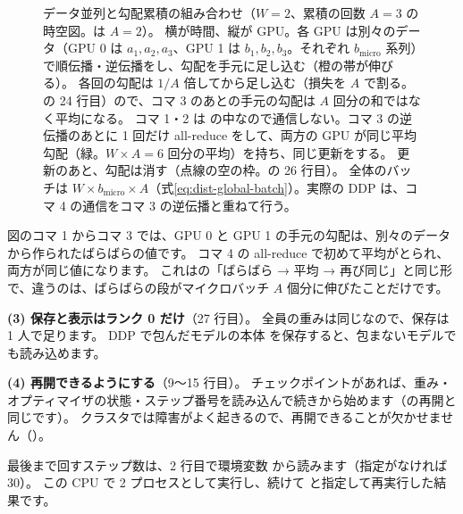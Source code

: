 \begin{figure}[tbp]
\caption{データ並列と勾配累積の組み合わせ（$W=2$、累積の回数 $A=3$ の時空図。は $A=2$）。
横が時間、縦が GPU。各 GPU は別々のデータ（GPU 0 は $a_1,a_2,a_3$、GPU 1 は $b_1,b_2,b_3$。それぞれ $b_{\text{micro}}$ 系列）で順伝播・逆伝播をし、勾配を手元に足し込む（橙の帯が伸びる）。
各回の勾配は $1/A$ 倍してから足し込む（損失を $A$ で割る。の 24 行目）ので、コマ 3 のあとの手元の勾配は $A$ 回分の和ではなく平均になる。
コマ 1・2 は  の中なので通信しない。コマ 3 の逆伝播のあとに 1 回だけ all-reduce をして、両方の GPU が同じ平均勾配（緑。$W\times A=6$ 回分の平均）を持ち、同じ更新をする。
更新のあと、勾配は消す（点線の空の枠。の 26 行目）。
全体のバッチは $W\times b_{\text{micro}}\times A$（式\eqref{eq:dist-global-batch}）。実際の DDP は、コマ 4 の通信をコマ 3 の逆伝播と重ねて行う。}
\label{fig:dist-accum}
\end{figure}

図のコマ 1 からコマ 3 では、GPU 0 と GPU 1 の手元の勾配は、別々のデータから作られたばらばらの値です。
コマ 4 の all-reduce で初めて平均がとられ、両方が同じ値になります。
これはの「ばらばら → 平均 → 再び同じ」と同じ形で、違うのは、ばらばらの段がマイクロバッチ $A$ 個分に伸びたことだけです。

\textbf{(3) 保存と表示はランク 0 だけ}（27 行目）。
全員の重みは同じなので、保存は 1 人で足ります。
DDP で包んだモデルの本体  を保存すると、包まないモデルでも読み込めます。

\textbf{(4) 再開できるようにする}（9〜15 行目）。
チェックポイントがあれば、重み・オプティマイザの状態・ステップ番号を読み込んで続きから始めます（の再開と同じです）。
クラスタでは障害がよく起きるので、再開できることが欠かせません（）。

最後まで回すステップ数は、2 行目で環境変数  から読みます（指定がなければ 30）。
この CPU で 2 プロセスとして実行し、続けて  と指定して再実行した結果です。

